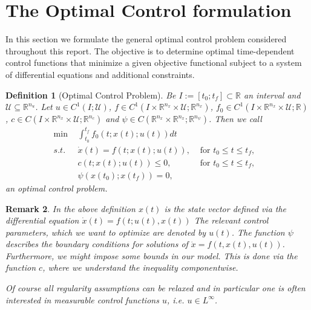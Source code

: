 \documentclass[a4paper]{article}
\theoremstyle{definitions}
\newtheorem{defi}{Definition}[section]
\theoremstyle{bemerkung}
\newtheorem{rem}[defi]{Remark}
\theoremstyle{satz}
\theoremstyle{satz}
\begin{document}
\section{The Optimal Control formulation}

In this section we formulate the general optimal control problem considered throughout this report. The objective is to determine optimal time-dependent control functions that minimize a given objective functional subject to a system of differential equations and additional constraints.

\begin{defi}[Optimal Control Problem]
    Be $I:=[t_0; t_f]\subset\mathbb{R}$ an interval and $\mathcal{U} \subseteq\mathbb{R}^{n_u}$. Let $u \in C^1(I;\mathcal{U})$, $f \in C^1(I\times \mathbb{R}^{n_x}\times \mathcal{U}; \mathbb{R}^{n_x})$, $f_0\in C^1(I\times \mathbb{R}^{n_x}\times \mathcal{U}; \mathbb{R})$, $c\in C(I\times\mathbb{R}^{n_x}\times \mathcal{U}; \mathbb{R}^{n_c})$ and $\psi \in C(\mathbb{R}^{n_x}\times\mathbb{R}^{n_x}; \mathbb{R}^{n_\psi})$. Then we call
    \begin{equation}
        \label{def: OC}
        \begin{aligned}
            \min &\int_{t_0}^{t_f}f_0(t;x(t); u(t)) dt\\
             s.t. \text{ } &\dot{x}(t) = f(t;x(t);u(t)), & \text{ for } t_0\leq t \leq t_f,\\
            &  c(t;x(t);u(t)) \leq 0, & \text{ for } t_0\leq t \leq t_f, & \\
            & \psi(x(t_0); x(t_f)) = 0, 
        \end{aligned}
        \tag{OC}
    \end{equation}
    an optimal control problem.
\end{defi}

\begin{rem}
    In the above definition $x(t)$ is the state vector defined via the differential equation $\dot{x}(t)=f(t; u(t),x(t))$ The relevant control parameters, which we want to optimize are denoted by $u(t)$.
    The function $\psi$ describes the boundary conditions for solutions of $\dot{x}=f(t,x(t),u(t))$. Furthermore, we might impose some bounds in our model. This is done via the function $c$, where we understand the inequality componentwise.

    Of course all regularity assumptions can be relaxed and in particular one is often interested in measurable control functions $u$, i.e. $u \in L^\infty$.

\end{rem}
\end{document}
